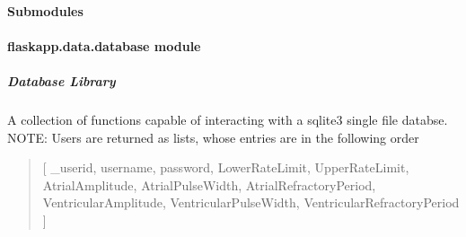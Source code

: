 \documentclass[letterpaper,10pt,english]{sphinxmanual}
\begin{document}
\paragraph{Submodules}
\label{\detokenize{flaskapp.data:submodules}}

\paragraph{flaskapp.data.database module}
\label{\detokenize{flaskapp.data:module-flaskapp.data.database}}\label{\detokenize{flaskapp.data:flaskapp-data-database-module}}

\subparagraph{Database Library}
\label{\detokenize{flaskapp.data:database-library}}
A collection of functions capable of interacting with
a sqlite3 single file databse.
NOTE: Users are returned as lists, whose entries are
in the following order
\begin{quote}

{[} \_userid,
username,
password,
LowerRateLimit,
UpperRateLimit,
AtrialAmplitude,
AtrialPulseWidth,
AtrialRefractoryPeriod,
VentricularAmplitude,
VentricularPulseWidth,
VentricularRefractoryPeriod {]}
\end{quote}
\end{document}
